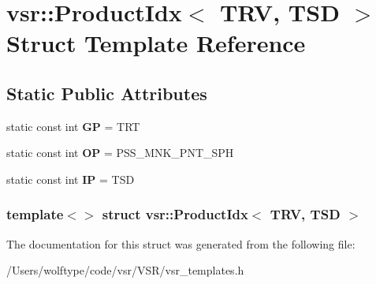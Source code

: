 \hypertarget{structvsr_1_1_product_idx_3_01_t_r_v_00_01_t_s_d_01_4}{\section{vsr\-:\-:Product\-Idx$<$ T\-R\-V, T\-S\-D $>$ Struct Template Reference}
\label{structvsr_1_1_product_idx_3_01_t_r_v_00_01_t_s_d_01_4}
}
\subsection*{Static Public Attributes}
\begin{DoxyCompactItemize}
\item 
\hypertarget{structvsr_1_1_product_idx_3_01_t_r_v_00_01_t_s_d_01_4_a38c45073ff04248be1f613a424ea340d}{static const int {\bfseries G\-P} = T\-R\-T}\label{structvsr_1_1_product_idx_3_01_t_r_v_00_01_t_s_d_01_4_a38c45073ff04248be1f613a424ea340d}

\item 
\hypertarget{structvsr_1_1_product_idx_3_01_t_r_v_00_01_t_s_d_01_4_a29efae4e27bd4c7d002dd5f939e50814}{static const int {\bfseries O\-P} = P\-S\-S\-\_\-\-M\-N\-K\-\_\-\-P\-N\-T\-\_\-\-S\-P\-H}\label{structvsr_1_1_product_idx_3_01_t_r_v_00_01_t_s_d_01_4_a29efae4e27bd4c7d002dd5f939e50814}

\item 
\hypertarget{structvsr_1_1_product_idx_3_01_t_r_v_00_01_t_s_d_01_4_a78f0008837e8c5af6644e1123863a4c5}{static const int {\bfseries I\-P} = T\-S\-D}\label{structvsr_1_1_product_idx_3_01_t_r_v_00_01_t_s_d_01_4_a78f0008837e8c5af6644e1123863a4c5}

\end{DoxyCompactItemize}
\subsubsection*{template$<$$>$ struct vsr\-::\-Product\-Idx$<$ T\-R\-V, T\-S\-D $>$}



The documentation for this struct was generated from the following file\-:\begin{DoxyCompactItemize}
\item 
/\-Users/wolftype/code/vsr/\-V\-S\-R/vsr\-\_\-templates.\-h\end{DoxyCompactItemize}
